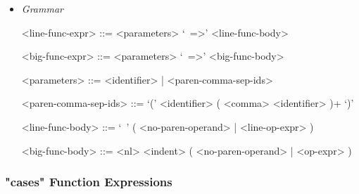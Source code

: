 \documentclass{article}
\begin{document}
\begin{itemize}
\item \textit{Grammar}
\begin{grammar}
<line-func-expr> ::= <parameters> `\ =>' <line-func-body>

<big-func-expr> ::= <parameters> `\ =>' <big-func-body>

<parameters> ::= <identifier> | <paren-comma-sep-ids>

<paren-comma-sep-ids> ::= `(' <identifier> ( <comma> <identifier> )+ `)'

<line-func-body> ::= `\ ' ( <no-paren-operand> | <line-op-expr> )

<big-func-body> ::= <nl> <indent> ( <no-paren-operand> | <op-expr> )
\end{grammar}
\end{itemize}

\subsubsection{"cases" Function Expressions}
\label{subsubsec:casessyntax}
\end{document}
